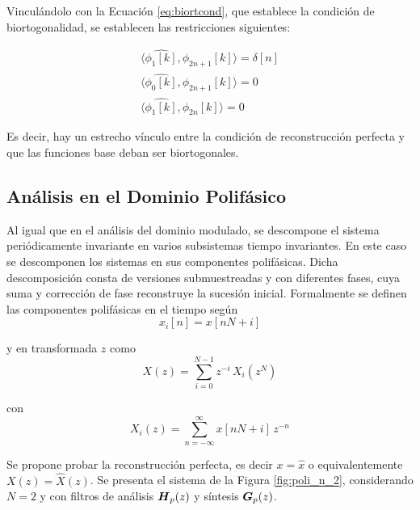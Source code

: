	Vinculándolo con la Ecuación \eqref{eq:biortcond}, que establece la condición de biortogonalidad, se establecen las restricciones siguientes:

	\begin{align}
		\langle \hat{\phi_1[k]},\phi_{2n+1}[k] \rangle = \delta[n]	\\
		\langle \hat{\phi_0[k]},\phi_{2n+1}[k]\rangle	= 0	\\
		\langle \hat{\phi_1[k]},\phi_{2n}[k]\rangle = 0
	\end{align}

	Es decir, hay un estrecho vínculo entre la condición de reconstrucción perfecta y que las funciones base deban ser biortogonales.

\subsection{Análisis en el Dominio Polifásico}

	Al igual que en el análisis del dominio modulado, se descompone el sistema periódicamente 
	invariante en varios subsistemas tiempo invariantes. En este caso se descomponen los sistemas en sus componentes polifásicas. 
	Dicha descomposición consta de versiones submuestreadas y con diferentes fases, cuya suma y corrección de fase reconstruye la sucesión inicial.
	Formalmente se definen las componentes polifásicas en el tiempo según
		\begin{equation}
			x_i[n] = x[nN+i]
			\label{eq:poly_comp}
		\end{equation}
		
		y en transformada $z$ como 
		\begin{equation} %
			X(z)= \sum^{N-1}_{i=0} z^{-i} \, X_i(z^N)
			\label{eq:poly_comp_z}
		\end{equation}
		
		con
		\begin{equation} %
			X_i(z)=\sum^{\infty}_{n=-\infty} x[nN+ i]\, z^{-n}
			\label{eq:poly_comp_i_z}
		\end{equation}

	Se propone probar la reconstrucción perfecta, es decir $x = \hat{x}$ o equivalentemente $X(z) = \hat{X}(z)$. Se presenta el sistema de la Figura \ref{fig:poli_n_2}, considerando $N=2$ y con filtros de análisis $\boldsymbol{H}_p(z)$ y síntesis $\boldsymbol{G}_p(z)$. 

